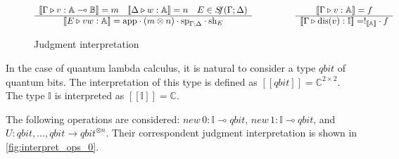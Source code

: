 \begin{figure} [H]
\begin{equation*}
\begin{split}
\begin{aligned}
\begin{minipage}[t]{0.3\textwidth}
$\begin{array}{c} 
     [\![\Gamma \triangleright v: \mathbb{A} \multimap \mathbb{B} ]\!] = m \quad [\![  \Delta \triangleright w: \mathbb{A} ]\!] =n \quad E \in S\hspace{-3pt}f(\Gamma;\Delta)  \\
    \hline
  [\![ E \triangleright v w: \mathbb{A} ]\!] = \text{app} \cdot (m \otimes n) \cdot \text{sp}_{\Gamma;\Delta} \cdot \text{sh}_{E}
\end{array}
$ \end{minipage}
\hspace{190 pt} %
\begin{minipage}[t]{0.3\textwidth}
$\begin{array}{c}
     [\![\Gamma \triangleright v: \mathbb{A}]\!]  = f \\
    \hline
   [\![ \Gamma \triangleright \text{dis}(v):  \mathbb{I} ]\!] = !_{[\![ \mathbb{A} ]\!]} \cdot f
\end{array}
$
\end{minipage}
\end{aligned}
\end{split}
\end{equation*}
\caption{Judgment interpretation}
\label{fig:denotational_sem}
\end{figure}


In the case of quantum lambda calculus, it is natural to consider a type $\textit{qbit}$ of quantum bits.  The interpretation of this type is defined as $[\![\textit{qbit}]\!]=\mathbb{C}^{2\times 2}$. The type $\mathbb{I}$ is interpreted as $[\![\mathbb{I}]\!]=\mathbb{C}$.

The following operations are considered: $\textit{new} \hspace{2pt} 0  :\mathbb{I}  \multimap \textit{qbit} $, $\textit{new} \hspace{2pt} 1  :\mathbb{I}  \multimap \textit{qbit} $, and $\textit{U}:\textit{qbit},\ldots,\textit{qbit} \xrightarrow{} \textit{qbit}^{\otimes n}$. Their correspondent judgment interpretation is shown in \autoref{fig:interpret_ops_0}. 



